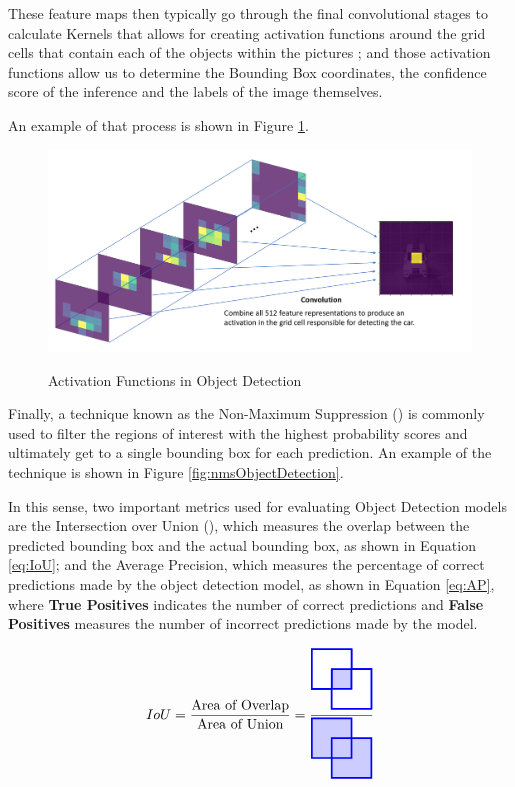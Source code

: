 These feature maps then typically go through the final convolutional stages to
calculate Kernels that allows for creating activation functions around the grid
cells that contain each of the objects within the pictures \cite{JeremyJordan};
and those activation functions allow us to determine the Bounding Box
coordinates, the confidence score of the inference and the labels of the image
themselves. 

An example of that process is shown in Figure \ref{fig:convolutionActivation}.

\begin{figure}[H]
	\centering
	\caption[Activation Functions in Object Detection]{Activation Functions in Object Detection}
    \includegraphics[width=1\textwidth]{./images/convolution-activation.png}
	\label{fig:convolutionActivation}
\end{figure}

Finally, a technique known as the Non-Maximum Suppression
() is commonly used to filter the regions
of interest with the highest probability scores and ultimately get to a single
bounding box for each prediction. 
An example of the technique is shown in Figure \ref{fig:nmsObjectDetection}.

In this sense, two important metrics used for evaluating Object Detection models
are the Intersection over Union (), which measures 
the overlap between the predicted bounding box and the actual bounding box, 
as shown in Equation \ref{eq:IoU}; and the Average Precision, which measures the percentage 
of correct predictions made by the object detection model, as shown in Equation 
\ref{eq:AP}, where \textbf{True Positives} indicates the number of correct predictions and
\textbf{False Positives} measures the number of incorrect predictions made by the model.

\begin{equation}
\label{eq:IoU}
IoU = \frac{\text{Area of Overlap}}{\text{Area of Union}}=
\frac{
    \tikz{\fill[draw=blue, very thick, fill=blue!20] (0,0) rectangle (1,1) (0.5,-0.5) rectangle (1.5,0.5);
    \fill[draw=blue, very thick, fill=white, even odd rule] (0,0) rectangle (1,1) (0.5,-0.5) rectangle (1.5,0.5);}}
{\tikz{\fill[draw=blue, fill=blue!20, very thick] (0,0) rectangle (1,1) (0.5,-0.5) rectangle (1.5,0.5);}}
\end{equation}

